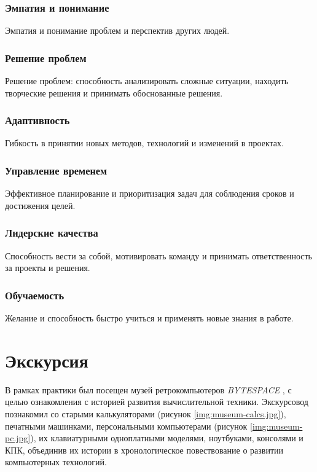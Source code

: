 \documentclass[variant=practice]{bsuir}
\begin{document}
\subsection{Эмпатия и понимание} Эмпатия и понимание проблем и перспектив других
людей.

\subsection{Решение проблем} Решение проблем: способность анализировать сложные
ситуации, находить творческие решения и принимать обоснованные решения.

\subsection{Адаптивность} Гибкость в принятии новых методов, технологий и
изменений в проектах.

\subsection{Управление временем} Эффективное планирование и приоритизация задач
для соблюдения сроков и достижения целей.

\subsection{Лидерские качества} Способность вести за собой, мотивировать команду
и принимать ответственность за проекты и решения.

\subsection{Обучаемость} Желание и способность быстро учиться и применять новые
знания в работе.

\chapter{Экскурсия}

В рамках практики был посещен музей ретрокомпьютеров \textit{BYTESPACE}
, с целью ознакомления с историей
развития вычислительной техники. Экскурсовод познакомил со старыми
калькуляторами (рисунок \ref{img:museum-calcs.jpg}), печатными машинками,
персональными компьютерами (рисунок \ref{img:museum-pc.jpg}), их клавиатурными
одноплатными моделями, ноутбуками, консолями и КПК, объединив их истории в
хронологическое повествование о развитии компьютерных технологий.
\end{document}
